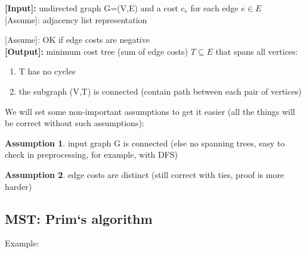 \documentclass[a4paper,12pt]{article}
\theoremstyle{plain}
\theoremstyle{definition}
\newtheorem{assumption}{Assumption}[subsection]
\theoremstyle{remark}
\begin{document}
\textbf{[Input]:} undirected graph G=(V,E) and a cost $c_e$ for each edge $e \in E$
\\

[Assume]: adjacency list representation

[Assume]: OK if edge costs are negative
\\

\textbf{[Output]:} minimum cost tree (sum of edge costs) $T \subseteq E$ that spans all vertices:
\begin{enumerate}
\item T has no cycles
\item the subgraph (V,T) is connected (contain path between each pair of vertices)
\end{enumerate}
We will set some non-important assumptions to get it easier (all the things will be correct without such assumptions):
\begin{assumption}input graph G is connected (else no spanning trees, easy to check in preprocessing, for example, with DFS)\end{assumption}
\begin{assumption}edge costs are distinct (still correct with ties, proof is more harder)\end{assumption}



\subsection{MST: Prim`s algorithm}
Example:\\
\end{document}
